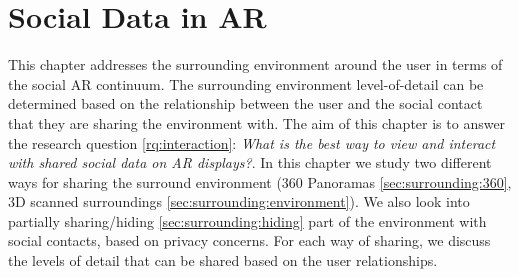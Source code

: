 \chapter{Social Data in AR} %
\label{ch:data} %

This chapter addresses the surrounding environment around the user in terms of the social AR continuum. The surrounding environment level-of-detail can be determined based on the relationship between the user and the social contact that they are sharing the environment with.  The aim of this chapter is to answer the research question \ref{rq:interaction}: \textit{What is the best way to view and interact with shared social data on AR displays?}. In this chapter we study two different ways for sharing the surround environment (360 Panoramas \ref{sec:surrounding:360}, 3D scanned surroundings \ref{sec:surrounding:environment}). We also look into partially sharing/hiding \ref{sec:surrounding:hiding} part of the environment with social contacts, based on privacy concerns. For each way of sharing, we discuss the levels of detail that can be shared based on the user relationships. 





